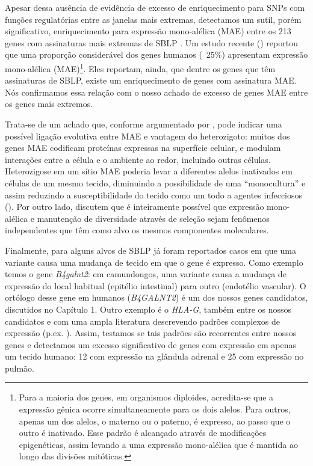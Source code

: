 \begin{refsection}
Apesar dessa ausência de evidência de excesso de enriquecimento para SNPs com funções regulatórias entre as janelas mais extremas, detectamos um sutil, porém significativo, enriquecimento para  expressão mono-alélica (MAE) entre os 213 genes com assinaturas mais extremas de SBLP  \parencite{Savova2016}.  Um estudo recente (\cite{Savova2016}) reportou que uma proporção considerável dos genes humanos (~25\%) apresentam expressão mono-alélica (MAE)\footnote{Para a maioria dos genes, em organismos diploides, acredita-se que a expressão gênica ocorre simultaneamente para os dois alelos. Para outros, apenas um dos alelos, o materno ou o paterno, é expresso, ao passo que o outro é inativado. Esse padrão é alcançado através de modificações epigenéticas, assim levando a uma expressão mono-alélica que é mantida ao longo das divisões mitóticas.}. Eles reportam, ainda, que dentre os genes que têm assinaturas de SBLP, existe um enriquecimento de genes com assinatura MAE. Nós confirmamos essa relação com o nosso achado de excesso de genes MAE entre os genes mais extremos.

Trata-se de um achado  que, conforme argumentado por \textcite{Savova2016}, pode indicar uma possível ligação evolutiva entre MAE e vantagem do heterozigoto: muitos dos genes MAE codificam proteínas expressas na superfície celular, e modulam interações entre a célula e o ambiente ao redor, incluindo outras células. Heterozigose em um sítio MAE poderia levar a diferentes alelos inativados em células de um mesmo tecido, diminuindo a possibilidade de uma \enquote{monocultura} e assim reduzindo a susceptibilidade do tecido como um todo a agentes infecciosos (\cite{Savova2016}). Por outro lado, \textcite{Savova2016} discutem que é inteiramente possível que expressão mono-alélica e manutenção de diversidade através de seleção sejam fenômenos independentes que têm como alvo os mesmos componentes moleculares. 

Finalmente, para alguns alvos de SBLP já foram reportados casos em que uma variante causa uma mudança de tecido em que o gene é expresso. Como exemplo temos o gene \emph{B4galnt2}: em camundongos, uma variante causa a mudança de expressão do local habitual (epitélio intestinal) para outro (endotélio vascular). O ortólogo desse gene em humanos (\emph{B4GALNT2}) é um dos nossos genes candidatos, discutidos no Capítulo 1. Outro exemplo é o \emph{HLA-G}, também entre os nossos candidatos e com uma ampla literatura descrevendo padrões complexos de expressão (p.ex. \cite{Tan2005}). Assim, testamos se tais padrões são recorrentes entre nossos genes e detectamos um excesso significativo de genes com expressão em apenas um tecido humano: 12 com expressão na glândula adrenal e 25 com expressão no pulmão. 


\end{refsection}

